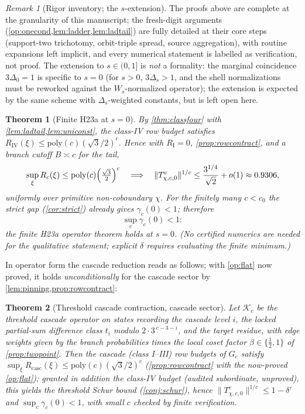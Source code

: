 \documentclass[11pt]{article}
\theoremstyle{plain}
\newtheorem{theorem}{Theorem}
\theoremstyle{definition}
\theoremstyle{remark}
\newtheorem*{remark}{Remark}
\begin{document}
\begin{remark}[Rigor inventory; the $s$-extension]
The proofs above are complete at the granularity of this manuscript; the
fresh-digit arguments (\cref{op:onecond,lem:ladder,lem:ladtail}) are
fully detailed at their core steps (support-two trichotomy, orbit-triple
spread, source aggregation), with routine expansions left implicit, and
every numerical statement is labelled as verification, not proof. The
extension to $s\in(0,1]$ is \emph{not} a formality: the marginal
coincidence $3\Delta_0=1$ is specific to $s=0$ (for $s>0$,
$3\Delta_s>1$, and the shell normalizations must be reworked against the
$W_s$-normalized operator); the extension is expected by the same scheme
with $\Delta_s$-weighted constants, but is left open here.
\end{remark}

\begin{theorem}[Finite H23a at $s=0$]
\label{thm:final}
By \cref{thm:classfour} with \cref{lem:ladtail,lem:uniconst}, the
class-IV row budget satisfies
$R_{\mathrm{IV}}(\xi)\le\mathrm{poly}(c)(\sqrt3/2)^c$. Hence with $R_{\mathrm
I}=0$, \cref{prop:rowcontract}, and a branch cutoff $B\asymp c$ for the
tail,
\[
\sup_\xi R_c(\xi)\le\mathrm{poly}(c)\Bigl(\tfrac{\sqrt3}2\Bigr)^{c}
\quad\Longrightarrow\quad
\lVert T^c_{\chi,c,0}\rVert^{1/c}\le\frac{3^{1/4}}{\sqrt2}+o(1)
\approx0.9306,
\]
uniformly over primitive non-coboundary $\chi$. For the finitely many
$c<c_0$ the strict gap (\cref{cor:strict}) already gives $\gamma_c(0)<1$;
therefore
\[
\sup_c\gamma_c(0)<1 :
\]
the finite H23a operator theorem holds at $s=0$. (No certified numerics are needed for the qualitative
statement; explicit $\delta$ requires evaluating the finite minimum.)
\end{theorem}

In operator form the cascade reduction reads as follows; with
\cref{op:flat} now proved, it holds \emph{unconditionally} for the
cascade sector by \cref{lem:pinning,prop:rowcontract}:

\begin{theorem}[Threshold cascade contraction, cascade sector]\label{op:cascade}
Let $\mathcal K_c$ be the threshold cascade operator on states recording
the cascade level $i$, the locked partial-sum difference class $t_i$
modulo $2\cdot3^{\,c-3-i}$, and the target residue, with edge weights given
by the branch probabilities times the local coset factor
$\beta\in\{\tfrac12,1\}$ of \cref{prop:twopoint}. Then the cascade
(class I--III) row budgets of $G_c$ satisfy
$\sup_\xi R_{\mathrm{casc}}(\xi)\le\mathrm{poly}(c)(\sqrt3/2)^c$
(\cref{prop:rowcontract} with the now-proved \cref{op:flat}); granted in
addition the class-IV budget (audited subordinate, unproved), this yields
the threshold Schur bound (\cref{conj:schur}), hence
$\lVert T^c_{\chi,c,0}\rVert^{1/c}\le1-\delta'$ and
$\sup_c\gamma_c(0)<1$, with small $c$ checked by finite verification.
\end{theorem}
\end{document}
